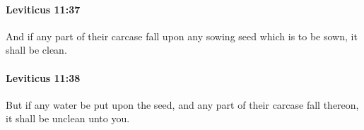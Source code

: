 		\paragraph{Leviticus 11:37} %
			\label{LEVITICUS-11-37}

			And if any part of their carcase fall upon any sowing seed which is to be sown, it shall be clean.


		\paragraph{Leviticus 11:38} %
			\label{LEVITICUS-11-38}

			But if any water be put upon the seed, and any part of their carcase fall thereon, it shall be unclean unto you.


